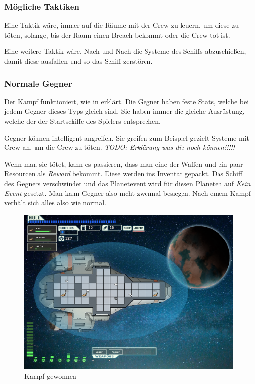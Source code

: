 \documentclass[fontsize=12pt,paper=a4,twoside]{scrartcl}
\begin{document}
\subsubsection{Mögliche Taktiken}

Eine Taktik wäre, immer auf die Räume mit der Crew zu feuern, um diese zu töten, solange, bis der Raum einen Breach bekommt oder die Crew tot ist. 

Eine weitere Taktik wäre, Nach und Nach die Systeme des Schiffs abzuschießen, damit diese ausfallen und so das Schiff zerstören. 

\subsubsection{Normale Gegner}

Der Kampf funktioniert, wie in  erklärt. Die Gegner haben feste Stats, welche bei jedem Gegner dieses Typs gleich sind. Sie haben immer die gleiche Ausrüstung, welche der der Startschiffe des Spielers entsprechen. 

Gegner können intelligent angreifen. Sie greifen zum Beispiel gezielt Systeme mit Crew an, um die Crew zu töten. \textit{TODO: Erklärung was die noch können!!!!!}

Wenn man sie tötet, kann es passieren, dass man eine der Waffen und ein paar Resourcen als \textit{Reward} bekommt. Diese werden ins Inventar gepackt. Das Schiff des Gegners verschwindet und das Planetevent wird für diesen Planeten auf \textit{Kein Event} gesetzt. Man kann Gegner also nicht zweimal besiegen. Nach einem Kampf verhält sich alles also wie normal. 

\begin{figure}[H]
\centering
\includegraphics[width=1\linewidth]{DasSpiel/Kampf/fightwin.png}
\caption{Kampf gewonnen}
\end{figure}
\end{document}

